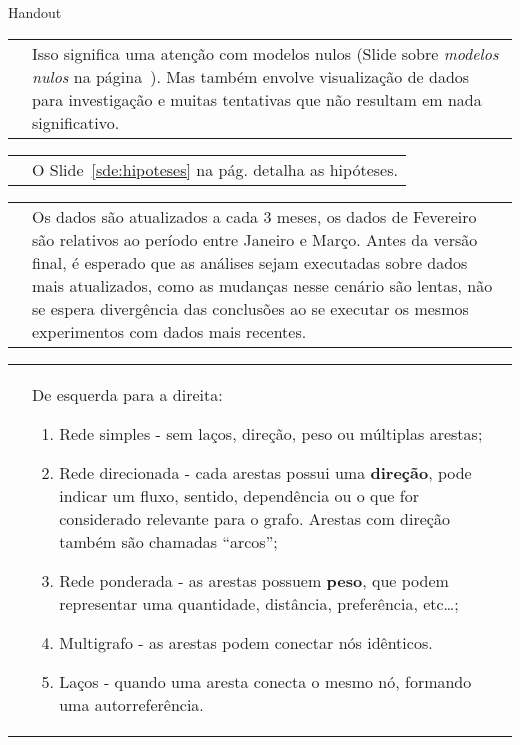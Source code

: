 \documentclass[10pt,a4paper,final]{article}
\begin{document}
  \begin{center}
    Handout
  \end{center}

\newpage

\small

\begin{tabular}{p{.45\linewidth} P{.45\linewidth}}
  \vspace{0pt}
  &
  \vspace{2pt}
  Isso significa uma atenção com modelos nulos (Slide sobre \textit{modelos nulos} na página~\pageref{sde:modelos-nulos}). Mas também envolve visualização de dados para investigação e muitas tentativas que não resultam em nada significativo.
\end{tabular}

\begin{tabular}{p{.45\linewidth} P{.45\linewidth}}
  \vspace{0pt}
  &
  \vspace{2pt}
  O Slide~\ref{sde:hipoteses} na pág.\pageref{sde:hipoteses} detalha as hipóteses.
\end{tabular}

\begin{tabular}{p{.45\linewidth} P{.45\linewidth}}
  \vspace{0pt}
  &
  \vspace{2pt}
  Os dados são atualizados a cada 3 meses, os dados de Fevereiro são relativos ao período entre Janeiro e Março. Antes da versão final, é esperado que as análises sejam executadas sobre dados mais atualizados, como as mudanças nesse cenário são lentas, não se espera divergência das conclusões ao se executar os mesmos experimentos com dados mais recentes.
\end{tabular}

\begin{tabular}{p{.45\linewidth} P{.45\linewidth}}
  \vspace{0pt}
  &
  \vspace{2pt}
  De esquerda para a direita:
  \begin{enumerate}
    \item Rede simples - sem laços, direção, peso ou múltiplas arestas;
    \item Rede direcionada - cada arestas possui uma \textbf{direção}, pode indicar um fluxo, sentido, dependência ou o que for considerado relevante para o grafo. Arestas com direção também são chamadas \enquote{arcos};
    \item Rede ponderada - as arestas possuem \textbf{peso}, que podem representar uma quantidade, distância, preferência, etc\ldots;
    \item Multigrafo - as arestas podem conectar nós idênticos.
    \item Laços - quando uma aresta conecta o mesmo nó, formando uma autorreferência.
  \end{enumerate}
  
\end{tabular}
\end{document}
